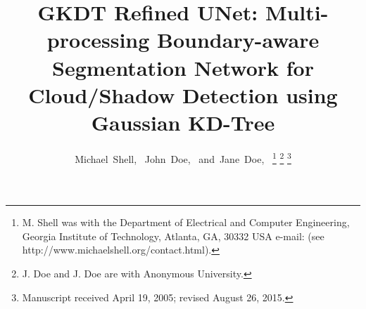 \documentclass[journal]{IEEEtran}
\begin{document}
%
\title{GKDT Refined UNet: Multi-processing Boundary-aware Segmentation Network for Cloud/Shadow Detection using Gaussian KD-Tree}
%
%
%

\author{Michael~Shell,~
        John~Doe,~
        and~Jane~Doe,~%
\thanks{M. Shell was with the Department
of Electrical and Computer Engineering, Georgia Institute of Technology, Atlanta,
GA, 30332 USA e-mail: (see http://www.michaelshell.org/contact.html).}%
\thanks{J. Doe and J. Doe are with Anonymous University.}%
\thanks{Manuscript received April 19, 2005; revised August 26, 2015.}}

% 
%
\end{document}
